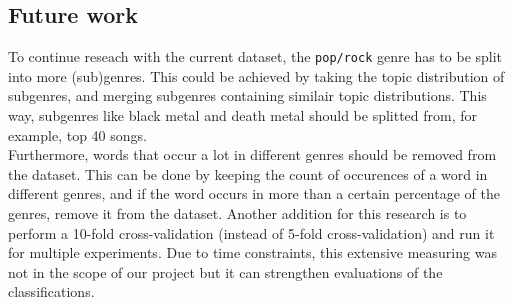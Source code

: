 \subsection{Future work}
To continue reseach with the current dataset, the \verb|pop/rock| genre has to be split into more (sub)genres. This could be achieved by taking the topic distribution of subgenres, and merging subgenres containing similair topic distributions. This way, subgenres like black metal and death metal should be splitted from, for example, top 40 songs. \\
Furthermore, words that occur a lot in different genres should be removed from the dataset. This can be done by keeping the count of occurences of a word in different genres, and if the word occurs in more than a certain percentage of the genres, remove it from the dataset.
Another addition for this research is to perform a 10-fold cross-validation (instead of 5-fold cross-validation) and run it for multiple experiments. Due to time constraints, this extensive measuring was not in the scope of our project but it can strengthen evaluations of the classifications.